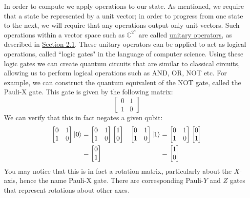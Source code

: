 \documentclass{article}
\renewcommand{\ket}{\Ket}
\theoremstyle{plain}
\theoremstyle{centered}
\renewcommand{\ket}{\Ket}
\newcommand{\bb}[1]{\mathbb{#1}}
\begin{document}
        In order to compute we apply operations to our state. As mentioned, we require that a state be represented by a unit vector; in order to progress from one state to the next, we will require that any operations output only unit vectors. Such operations within a vector space such as $\bb{C}^{2^n}$ are called \hyperref[def:unitary_operator]{unitary operators}, as described in \hyperref[history:linear_algebra]{Section 2.1}.
        These unitary operators can be applied to act as logical operations, called ``logic gates" in the language of computer science. Using these logic gates we can create quantum circuits that are similar to classical circuits, allowing us to perform logical operations such as AND, OR, NOT etc.
        For example, we can construct the quantum equivalent of the NOT gate, called the Pauli-X gate. 
        This gate is given by the following matrix:
            $$\begin{bmatrix} 0 & 1 \\ 1 & 0 \end{bmatrix}$$
        We can verify that this in fact negates a given qubit:
        \begin{align*}
            \begin{bmatrix} 0 & 1 \\ 1 & 0 \end{bmatrix} \ket{0} &= \begin{bmatrix} 0 & 1 \\ 1 & 0 \end{bmatrix} \begin{bmatrix} 1 \\ 0 \end{bmatrix}& \begin{bmatrix} 0 & 1 \\ 1 & 0 \end{bmatrix} \ket{1} &= \begin{bmatrix} 0 & 1 \\ 1 & 0 \end{bmatrix} \begin{bmatrix} 0 \\ 1 \end{bmatrix}\\
            &= \begin{bmatrix} 0 \\ 1 \end{bmatrix} & &= \begin{bmatrix} 1 \\ 0 \end{bmatrix}
        \end{align*}
        You may notice that this is in fact a rotation matrix, particularly about the $X$-axis, hence the name Pauli-X gate.
        There are corresponding Pauli-$Y$ and $Z$ gates that represent rotations about other axes.
        
\end{document}
